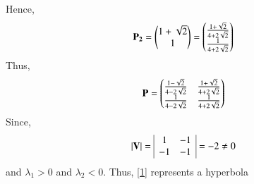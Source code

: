 \documentclass[journal,12pt,twocolumn]{IEEEtran}
\begin{document}
Hence,
\begin{align}
	\mathbf{P_2}= \begin{pmatrix}1+\sqrt{2} \\ 1\end{pmatrix} = \begin{pmatrix}\frac{1+\sqrt{2}}{4+2\sqrt{2}} \\ \frac{1}{4+2\sqrt{2}}\end{pmatrix}
\end{align}
Thus, 
\begin{align}
	\mathbf{P} = \begin{pmatrix}\frac{1-\sqrt{2}}{4-2\sqrt{2}} & \frac{1+\sqrt{2}}{4+2\sqrt{2}} \\ \frac{1}{4-2\sqrt{2}} & \frac{1}{4+2\sqrt{2}}\end{pmatrix}
\end{align}
Since,
\begin{align}
	\left\vert\mathbf{V}\right\vert =
	\begin{array}{|cc|}
		1 & -1\\ -1 & -1
	\end{array}=-2 \not=0 
\end{align}
and $\lambda_1 >0$ and $\lambda_2< 0$. Thus, \eqref{1} represents a hyperbola
\end{document}
